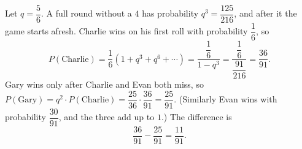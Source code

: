 Let $q=\dfrac{5}{6}$. A full round without a $4$ has probability $q^3=\dfrac{125}{216}$, and after it the game starts afresh. Charlie wins on his first roll with probability $\dfrac{1}{6}$, so
\[P(\text{Charlie})=\dfrac{1}{6}\left(1+q^3+q^6+\cdots\right)=\dfrac{\dfrac{1}{6}}{1-q^3}=\dfrac{\dfrac{1}{6}}{\dfrac{91}{216}}=\dfrac{36}{91}.\]
Gary wins only after Charlie and Evan both miss, so $P(\text{Gary})=q^2\cdot P(\text{Charlie})=\dfrac{25}{36}\cdot\dfrac{36}{91}=\dfrac{25}{91}$. (Similarly Evan wins with probability $\dfrac{30}{91}$, and the three add up to $1$.) The difference is
\[\dfrac{36}{91}-\dfrac{25}{91}=\boxed{\dfrac{11}{91}}.\]
